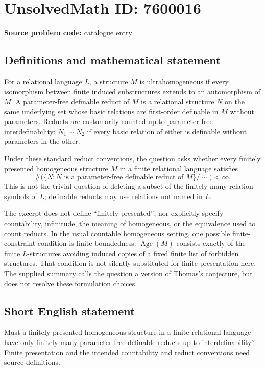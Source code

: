 \documentclass[11pt]{article}
\begin{document}
\section*{UnsolvedMath ID: 7600016}
\textbf{Source problem code:} catalogue entry
\subsection{Definitions and mathematical statement}
For a relational language \(L\), a structure \(M\) is ultrahomogeneous if every isomorphism between finite induced substructures extends to an automorphism of \(M\). A parameter-free definable reduct of \(M\) is a relational structure \(N\) on the same underlying set whose basic relations are first-order definable in \(M\) without parameters. Reducts are customarily counted up to parameter-free interdefinability: \(N_1\sim N_2\) if every basic relation of either is definable without parameters in the other.

Under these standard reduct conventions, the question asks whether every finitely presented homogeneous structure \(M\) in a finite relational language satisfies
\[
 \#\bigl(\{N:N\text{ is a parameter-free definable reduct of }M\}/\!\sim\bigr)<\infty.
\]
This is not the trivial question of deleting a subset of the finitely many relation symbols of \(L\); definable reducts may use relations not named in \(L\).

The excerpt does not define ``finitely presented'', nor explicitly specify countability, infinitude, the meaning of homogeneous, or the equivalence used to count reducts. In the usual countable homogeneous setting, one possible finite-constraint condition is finite boundedness: \(\operatorname{Age}(M)\) consists exactly of the finite \(L\)-structures avoiding induced copies of a fixed finite list of forbidden structures. That condition is not silently substituted for finite presentation here. The supplied summary calls the question a version of Thomas's conjecture, but does not resolve these formulation choices.
\subsection{Short English statement}
Must a finitely presented homogeneous structure in a finite relational language have only finitely many parameter-free definable reducts up to interdefinability? Finite presentation and the intended countability and reduct conventions need source definitions.
\end{document}
